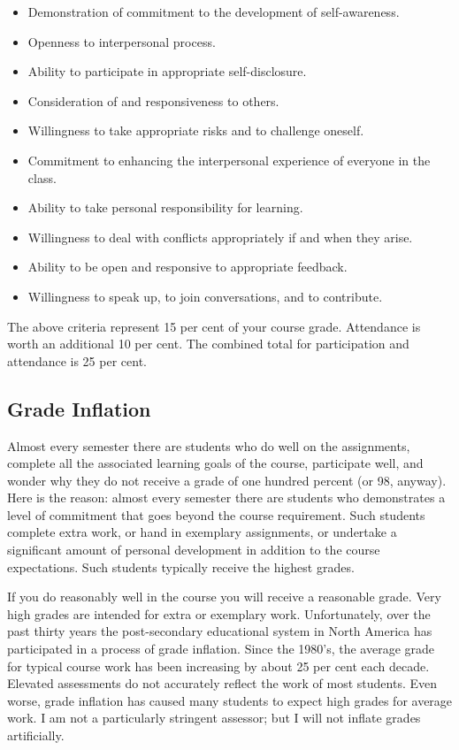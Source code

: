 \documentclass[letterpaper,10pt,headsepline]{scrreprt}
\begin{document}
\begin{itemize}
\item Demonstration of commitment to the development of self-awareness.
\item Openness to interpersonal process.
\item Ability to participate in appropriate self-disclosure.
\item Consideration of and responsiveness to others.
\item Willingness to take appropriate risks and to challenge oneself.
\item Commitment to enhancing the interpersonal experience of everyone in the class.
\item Ability to take personal responsibility for learning.
\item Willingness to deal with conflicts appropriately if and when they arise.
\item Ability to be open and responsive to appropriate feedback.
\item Willingness to speak up, to join conversations, and to contribute.
\end{itemize}

The above criteria represent 15 per cent of your course grade.
Attendance is worth an additional 10 per cent. The combined total for
participation and attendance is 25 per cent.

\clearpage

\subsection{Grade Inflation}
Almost every semester there are students who do well on the
assignments, complete all the associated learning goals of the course,
participate well, and wonder why they do not receive a grade of one
hundred percent (or 98, anyway). Here is the reason: almost every
semester there are students who demonstrates a level of commitment
that goes beyond the course requirement. Such students complete extra
work, or hand in exemplary assignments, or undertake a significant
amount of personal development in addition to the course expectations.
Such students typically receive the highest grades.

If you do reasonably well in the course you will receive a reasonable
grade. Very high grades are intended for extra or exemplary work.
Unfortunately, over the past thirty years the post-secondary
educational system in North America has participated in a process of
grade inflation. Since the 1980's, the average grade for typical
course work has been increasing by about 25 per cent each decade.
Elevated assessments do not accurately reflect the work of most
students. Even worse, grade inflation has caused many students to
expect high grades for average work. I am not a particularly stringent
assessor; but I will not inflate grades artificially.
\end{document}
